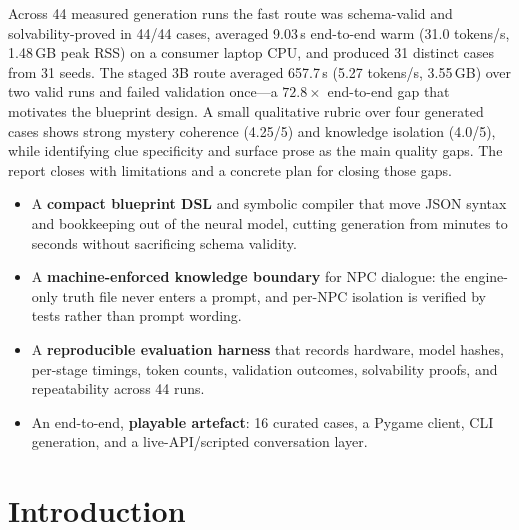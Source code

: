 ﻿\documentclass[11pt,a4paper]{report}
\begin{document}
Across 44 measured generation runs the fast route was schema-valid and solvability-proved in 44/44 cases, averaged 9.03\,s end-to-end warm (31.0 tokens/s, 1.48\,GB peak RSS) on a consumer laptop CPU, and produced 31 distinct cases from 31 seeds. The staged 3B route averaged 657.7\,s (5.27 tokens/s, 3.55\,GB) over two valid runs and failed validation once---a $72.8\times$ end-to-end gap that motivates the blueprint design. A small qualitative rubric over four generated cases shows strong mystery coherence (4.25/5) and knowledge isolation (4.0/5), while identifying clue specificity and surface prose as the main quality gaps. The report closes with limitations and a concrete plan for closing those gaps.

\vspace{0.9cm}
\begin{keybox}
\begin{itemize}
  \item A \textbf{compact blueprint DSL} and symbolic compiler that move JSON syntax and bookkeeping out of the neural model, cutting generation from minutes to seconds without sacrificing schema validity.
  \item A \textbf{machine-enforced knowledge boundary} for NPC dialogue: the engine-only truth file never enters a prompt, and per-NPC isolation is verified by tests rather than prompt wording.
  \item A \textbf{reproducible evaluation harness} that records hardware, model hashes, per-stage timings, token counts, validation outcomes, solvability proofs, and repeatability across 44 runs.
  \item An end-to-end, \textbf{playable artefact}: 16 curated cases, a Pygame client, CLI generation, and a live-API/scripted conversation layer.
\end{itemize}
\end{keybox}

\tableofcontents
\clearpage
{}
{}
\markboth{\listfigurename}{\listfigurename}
\listoffigures
\clearpage
{}
{}
\markboth{\listtablename}{\listtablename}
\listoftables
\clearpage

\setcounter{page}{1}

\chapter{Introduction}
\label{ch:intro}
\end{document}

